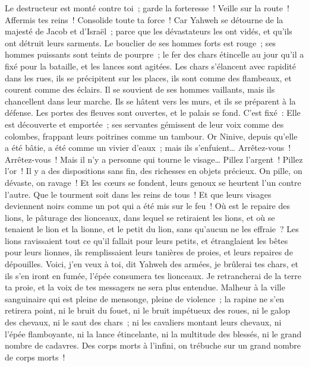 \begin{multicols}{2}
Le destructeur est monté contre toi~; garde la forteresse~! Veille sur la route~! Affermis tes reins~! Consolide toute ta force~!
Car Yahweh se détourne de la majesté de Jacob et d'Israël~; parce que les dévastateurs les ont vidés, et qu'ils ont détruit leurs sarments.
Le bouclier de ses hommes forts est rouge~; ses hommes puissants sont teints de pourpre~; le fer des chars étincelle au jour qu'il a fixé pour la bataille, et les lances sont agitées.
Les chars s'élancent avec rapidité dans les rues, ils se précipitent sur les places, ils sont comme des flambeaux, et courent comme des éclairs.
Il se souvient de ses hommes vaillants, mais ils chancellent dans leur marche. Ils se hâtent vers les murs, et ils se préparent à la défense.
Les portes des fleuves sont ouvertes, et le palais se fond.
C'est fixé~: Elle est découverte et emportée~; ses servantes gémissent de leur voix comme des colombes, frappant leurs poitrines comme un tambour.
Or Ninive, depuis qu'elle a été bâtie, a été comme un vivier d'eaux~; mais ils s'enfuient… Arrêtez-vous~! Arrêtez-vous~! Mais il n'y a personne qui tourne le visage…
Pillez l'argent~! Pillez l'or~! Il y a des dispositions sans fin, des richesses en objets précieux.
On pille, on dévaste, on ravage~! Et les cœurs se fondent, leurs genoux se heurtent l'un contre l'autre. Que le tourment soit dans les reins de tous~! Et que leurs visages deviennent noirs comme un pot qui a été mis sur le feu~!
Où est le repaire des lions, le pâturage des lionceaux, dans lequel se retiraient les lions, et où se tenaient le lion et la lionne, et le petit du lion, sans qu'aucun ne les effraie~?
Les lions ravissaient tout ce qu'il fallait pour leurs petits, et étranglaient les bêtes pour leurs lionnes, ils remplissaient leurs tanières de proies, et leurs repaires de dépouilles.
Voici, j'en veux à toi, dit Yahweh des armées, je brûlerai tes chars, et ils s'en iront en fumée, l'épée consumera tes lionceaux. Je retrancherai de la terre ta proie, et la voix de tes messagers ne sera plus entendue.
\VerseOne{}Malheur à la ville sanguinaire qui est pleine de mensonge, pleine de violence~; la rapine ne s'en retirera point,
ni le bruit du fouet, ni le bruit impétueux des roues, ni le galop des chevaux, ni le saut des chars~;
ni les cavaliers montant leurs chevaux, ni l'épée flamboyante, ni la lance étincelante, ni la multitude des blessés, ni le grand nombre de cadavres. Des corps morts à l'infini, on trébuche sur un grand nombre de corps morts~!

\end{multicols}
